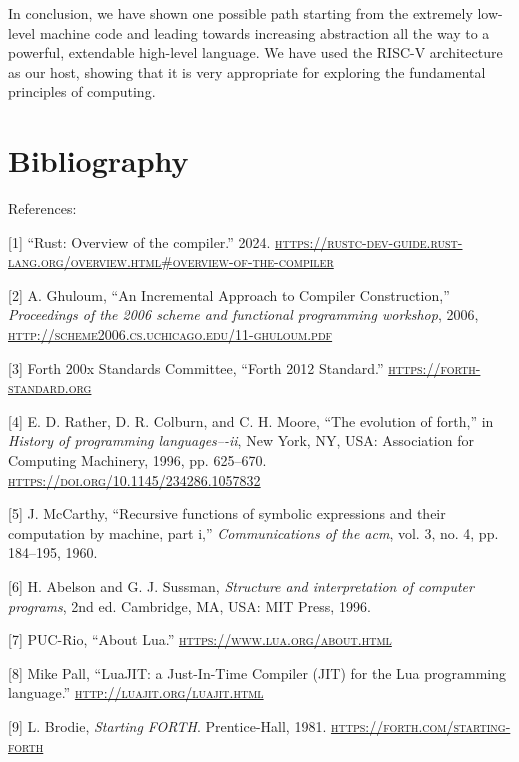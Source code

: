 \documentclass[a4paper,12pt,final]{article}
\begin{document}
In conclusion, we have shown one possible path starting from the
extremely low-level machine code and leading towards increasing
abstraction all the way to a powerful, extendable high-level language.
We have used the RISC-V architecture as our host, showing that it is
very appropriate for exploring the fundamental principles of
computing.
\clearpage


\section{Bibliography}
\label{sec:org6def4cf}

References:

\hypertarget{citeproc_bib_item_1}{[1] “Rust: Overview of the compiler.” 2024. \textsc{\url{https://rustc-dev-guide.rust-lang.org/overview.html\#overview-of-the-compiler}}}

\hypertarget{citeproc_bib_item_2}{[2] A. Ghuloum, “An Incremental Approach to Compiler Construction,” \textit{Proceedings of the 2006 scheme and functional programming workshop}, 2006, \textsc{\url{http://scheme2006.cs.uchicago.edu/11-ghuloum.pdf}}}

\hypertarget{citeproc_bib_item_3}{[3] Forth 200x Standards Committee, “Forth 2012 Standard.” \textsc{\url{https://forth-standard.org}}}

\hypertarget{citeproc_bib_item_4}{[4] E. D. Rather, D. R. Colburn, and C. H. Moore, “The evolution of forth,” in \textit{History of programming languages–-ii}, New York, NY, USA: Association for Computing Machinery, 1996, pp. 625–670. \textsc{\url{https://doi.org/10.1145/234286.1057832}}}

\hypertarget{citeproc_bib_item_5}{[5] J. McCarthy, “Recursive functions of symbolic expressions and their computation by machine, part i,” \textit{Communications of the acm}, vol. 3, no. 4, pp. 184–195, 1960.}

\hypertarget{citeproc_bib_item_6}{[6] H. Abelson and G. J. Sussman, \textit{Structure and interpretation of computer programs}, 2nd ed. Cambridge, MA, USA: MIT Press, 1996.}

\hypertarget{citeproc_bib_item_7}{[7] PUC-Rio, “About Lua.” \textsc{\url{https://www.lua.org/about.html}}}

\hypertarget{citeproc_bib_item_8}{[8] Mike Pall, “LuaJIT: a Just-In-Time Compiler (JIT) for the Lua programming language.” \textsc{\url{http://luajit.org/luajit.html}}}

\hypertarget{citeproc_bib_item_9}{[9] L. Brodie, \textit{Starting FORTH}. Prentice-Hall, 1981. \textsc{\url{https://forth.com/starting-forth}}}
\end{document}
